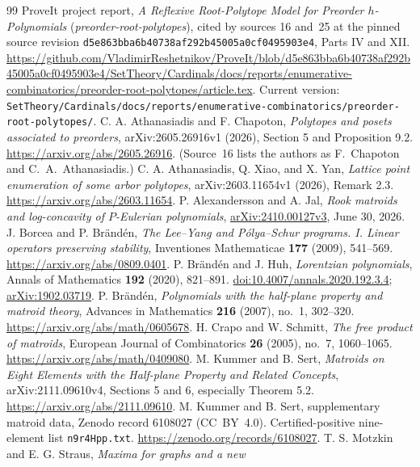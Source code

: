 \documentclass[11pt]{article}
\numberwithin{equation}{section}
\theoremstyle{definition}\newtheorem{definition}[theorem]{Definition}\newtheorem{remark}[theorem]{Remark}
\newcommand{\prp}{\emph{preorder-root-polytopes}}
\begin{document}
\begin{thebibliography}{99}\small
{} ProveIt project report, \emph{A Reflexive Root-Polytope Model for
Preorder $h$-Polynomials} (\prp), cited by sources 16 and~25 at the pinned
source revision \nolinkurl{d5e863bba6b40738af292b45005a0cf0495903e4}, Parts IV
and XII.
\url{https://github.com/VladimirReshetnikov/ProveIt/blob/d5e863bba6b40738af292b45005a0cf0495903e4/SetTheory/Cardinals/docs/reports/enumerative-combinatorics/preorder-root-polytopes/article.tex}.
Current version: \nolinkurl{SetTheory/Cardinals/docs/reports/enumerative-combinatorics/preorder-root-polytopes/}.
 C. A. Athanasiadis and F. Chapoton, \emph{Polytopes and posets
associated to preorders}, arXiv:2605.26916v1 (2026), Section 5 and
Proposition 9.2. \url{https://arxiv.org/abs/2605.26916}. (Source~16 lists
the authors as F.~Chapoton and C.~A.~Athanasiadis.)
 C. A. Athanasiadis, Q. Xiao, and X. Yan, \emph{Lattice point
enumeration of some arbor polytopes}, arXiv:2603.11654v1 (2026), Remark 2.3.
\url{https://arxiv.org/abs/2603.11654}.
 P. Alexandersson and A. Jal, \emph{Rook matroids and
log-concavity of $P$-Eulerian polynomials},
\href{https://arxiv.org/abs/2410.00127v3}{arXiv:2410.00127v3}, June 30, 2026.
 J. Borcea and P. Br\"and\'en, \emph{The Lee--Yang and
P\'olya--Schur programs. I. Linear operators preserving stability},
Inventiones Mathematicae \textbf{177} (2009), 541--569.
\url{https://arxiv.org/abs/0809.0401}.
 P. Br\"and\'en and J. Huh, \emph{Lorentzian polynomials},
Annals of Mathematics \textbf{192} (2020), 821--891.
\href{https://doi.org/10.4007/annals.2020.192.3.4}{doi:10.4007/annals.2020.192.3.4};
\href{https://arxiv.org/abs/1902.03719}{arXiv:1902.03719}.
 P. Br\"and\'en, \emph{Polynomials with the half-plane
property and matroid theory}, Advances in Mathematics \textbf{216} (2007),
no.~1, 302--320. \url{https://arxiv.org/abs/math/0605678}.
 H. Crapo and W. Schmitt, \emph{The free product of matroids},
European Journal of Combinatorics \textbf{26} (2005), no.~7, 1060--1065.
\url{https://arxiv.org/abs/math/0409080}.
 M. Kummer and B. Sert, \emph{Matroids on Eight Elements with the
Half-plane Property and Related Concepts}, arXiv:2111.09610v4, Sections 5
and 6, especially Theorem 5.2. \url{https://arxiv.org/abs/2111.09610}.
 M. Kummer and B. Sert, supplementary matroid data, Zenodo
record 6108027 (CC~BY~4.0). Certified-positive nine-element list
\texttt{n9r4Hpp.txt}. \url{https://zenodo.org/records/6108027}.
 T. S. Motzkin and E. G. Straus, \emph{Maxima for graphs and a new
}
\end{thebibliography}
\end{document}
